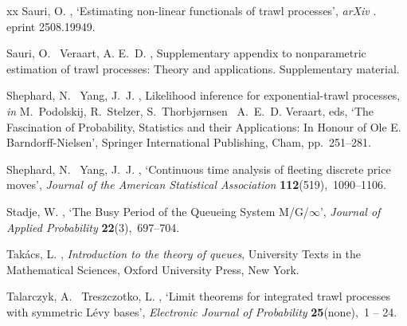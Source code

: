 \documentclass{article}
\theoremstyle{plain}
\theoremstyle{definition}
\theoremstyle{remark}
\begin{document}
\begin{thebibliography}{xx}
Sauri, O.  \harvardyearright , `Estimating non-linear functionals of trawl processes', {\em arXiv} .
\newblock eprint 2508.19949.
\newline{}

Sauri, O. \harvardand\ Veraart, A. E.~D.  \harvardyearright , Supplementary appendix to nonparametric estimation of trawl processes: Theory and applications.
\newblock Supplementary material.

Shephard, N. \harvardand\ Yang, J.~J.  \harvardyearright , Likelihood inference for exponential-trawl processes, {\em in} M.~Podolskij, R.~Stelzer, S.~Thorbj{\o}rnsen \harvardand\ A.~E.~D. Veraart, eds, `The Fascination of Probability, Statistics and their Applications: In Honour of Ole E. Barndorff-Nielsen', Springer International Publishing, Cham, pp.~251--281.
\newline{}

Shephard, N. \harvardand\ Yang, J.~J.  \harvardyearright , `Continuous time analysis of fleeting discrete price moves', {\em Journal of the American Statistical Association} {\bf 112}(519),~1090--1106.
\newline{}

Stadje, W.  \harvardyearright , `{The Busy Period of the Queueing System M/G/$\infty$}', {\em Journal of Applied Probability} {\bf 22}(3),~697--704.
\newline{}

Tak\'{a}cs, L.  \harvardyearright , {\em Introduction to the theory of queues}, University Texts in the Mathematical Sciences, Oxford University Press, New York.

Talarczyk, A. \harvardand\ Treszczotko, L.  \harvardyearright , `Limit theorems for integrated trawl processes with symmetric {L}\'{e}vy bases', {\em Electronic Journal of Probability} {\bf 25}(none),~1 -- 24.
\newline{}


\end{thebibliography}
\end{document}
